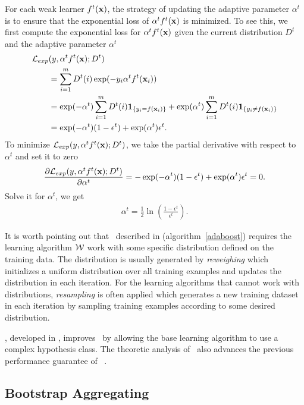{For each weak learner $f^t(\mathbf {x})$, the strategy of updating the adaptive parameter $\alpha^t$ is to ensure that the exponential loss of $\alpha^tf^t(\mathbf {x})$ is minimized.
To see this, we first compute the exponential loss for $\alpha^tf^t(\mathbf {x})$ given the current distribution $D^t$ and the adaptive parameter $\alpha^t$
\begin{align*}
	\mathcal{L}_{exp}&(y,\alpha^tf^t(\mathbf {x});D^t) \\
	&= \sum_{i=1}^mD^t(i)\exp(-y_i\alpha^tf^t(\mathbf {x}_i))\\
	&=\exp(-\alpha^t)\sum_{i=1}^mD^t(i)\mathbf{1}_{\{y_i=f(\mathbf {x}_i)\}} + \exp(\alpha^t)\sum_{i=1}^mD^t(i)\mathbf{1}_{\{y_i\neq f(\mathbf {x}_i)\}}\\
	&=\exp(-\alpha^t)(1-\epsilon^t) + \exp(\alpha^t)\epsilon^t.
\end{align*}
To minimize $\mathcal{L}_{exp}(y,\alpha^tf^t(\mathbf {x});D^t)$, we take the partial derivative with respect to $\alpha^t$ and set it to zero
\begin{align*}
	\frac{\partial\mathcal{L}_{exp}(y,\alpha^tf^t(\mathbf {x});D^t)}{\partial\alpha^t} = -\exp(-\alpha^t)(1-\epsilon^t) + \exp(\alpha^t)\epsilon^t=0.
\end{align*}
Solve it for $\alpha^t$, we get
\begin{align*}
	\alpha^{t} = \frac{1}{2}\ln\left(\frac{1-\epsilon^t}{\epsilon^t}\right).
\end{align*}

It is worth pointing out that \adaboost\ described in (algorithm~\ref{adaboost}) requires the learning algorithm $\mathcal{W}$ work with some specific distribution defined on the training data.
The distribution is usually generated by \textit{reweighing} which initializes a uniform distribution over all training examples and updates the distribution in each iteration.
For the learning algorithms that cannot work with distributions, \textit{resampling} is often applied which generates a new training dataset in each iteration by sampling training examples according to some desired distribution. 

\deepboosting, developed in \citep{Cortes14deep}, improves \adaboost\ by allowing the base learning algorithm to use a complex hypothesis class.
The theoretic analysis of \deepboosting\ also advances the previous performance guarantee of \adaboost\ \citep{Schapire97boosting,Koltchinskii00empirical}.




\subsection{Bootstrap Aggregating} \label{sc_ba}

}
